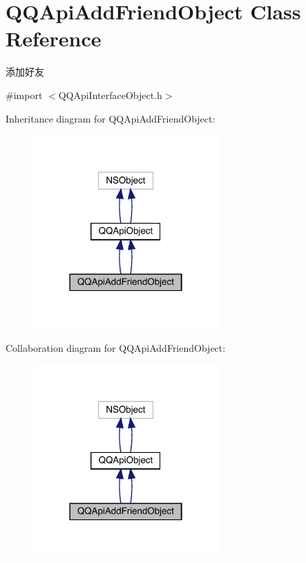 \hypertarget{interface_q_q_api_add_friend_object}{}\section{Q\+Q\+Api\+Add\+Friend\+Object Class Reference}
\label{interface_q_q_api_add_friend_object}


添加好友  




{\ttfamily \#import $<$Q\+Q\+Api\+Interface\+Object.\+h$>$}



Inheritance diagram for Q\+Q\+Api\+Add\+Friend\+Object\+:\nopagebreak
\begin{figure}[H]
\begin{center}
\leavevmode
\includegraphics[width=201pt]{interface_q_q_api_add_friend_object__inherit__graph}
\end{center}
\end{figure}


Collaboration diagram for Q\+Q\+Api\+Add\+Friend\+Object\+:\nopagebreak
\begin{figure}[H]
\begin{center}
\leavevmode
\includegraphics[width=201pt]{interface_q_q_api_add_friend_object__coll__graph}
\end{center}
\end{figure}
